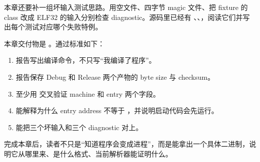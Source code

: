 本章还要补一组坏输入测试思路。用空文件、四字节 magic 文件、把 fixture 的 class 改成 ELF32 的输入分别检查 diagnostic。源码里已经有 、、，阅读它们并写出每个测试对应哪个失败特例。


本章交付物是 。通过标准如下：

\begin{enumerate}
  \item 报告写出编译命令，不只写“我编译了程序”。
  \item 报告保存 Debug 和 Release 两个产物的 byte size 与 checksum。
  \item 至少用  交叉验证 machine 和 entry 两个字段。
  \item 能解释为什么 entry address 不等于 ，并说明启动代码会先运行。
  \item 能把三个坏输入和三个 diagnostic 对上。
\end{enumerate}

完成本章后，读者不只是“知道程序会变成进程”，而是能拿出一个具体二进制，说明它从哪里来、是什么格式、当前解析器能证明什么。
